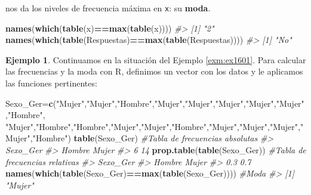 \documentclass[
]{book}
\newenvironment{Shaded}{\begin{snugshade}}{\end{snugshade}}
\newcommand{\CommentTok}[1]{\textcolor[rgb]{0.56,0.35,0.01}{\textit{#1}}}
\newcommand{\KeywordTok}[1]{\textcolor[rgb]{0.13,0.29,0.53}{\textbf{#1}}}
\newcommand{\NormalTok}[1]{#1}
\newcommand{\OperatorTok}[1]{\textcolor[rgb]{0.81,0.36,0.00}{\textbf{#1}}}
\newcommand{\StringTok}[1]{\textcolor[rgb]{0.31,0.60,0.02}{#1}}
\theoremstyle{definition}
\theoremstyle{definition}
\newtheorem{example}{Ejemplo}[chapter]
\theoremstyle{definition}
\theoremstyle{remark}
\begin{document}
nos da los niveles de frecuencia máxima en \texttt{x}: su \textbf{moda}.

\begin{Shaded}
\begin{Highlighting}[]
\KeywordTok{names}\NormalTok{(}\KeywordTok{which}\NormalTok{(}\KeywordTok{table}\NormalTok{(x)}\OperatorTok{==}\KeywordTok{max}\NormalTok{(}\KeywordTok{table}\NormalTok{(x))))}
\CommentTok{\#\textgreater{} [1] "2"}
\KeywordTok{names}\NormalTok{(}\KeywordTok{which}\NormalTok{(}\KeywordTok{table}\NormalTok{(Respuestas)}\OperatorTok{==}\KeywordTok{max}\NormalTok{(}\KeywordTok{table}\NormalTok{(Respuestas))))}
\CommentTok{\#\textgreater{} [1] "No"}
\end{Highlighting}
\end{Shaded}

\begin{example}
\protect\hypertarget{exm:sexo}{}{\label{exm:sexo} }Continuamos en la situación del Ejemplo \ref{exm:ex1601}. Para calcular las frecuencias y la moda con R, definimos un vector con los datos y le aplicamos las funciones pertinentes:
\end{example}

\begin{Shaded}
\begin{Highlighting}[]
\NormalTok{Sexo\_Ger=}\KeywordTok{c}\NormalTok{(}\StringTok{"Mujer"}\NormalTok{,}\StringTok{"Mujer"}\NormalTok{,}\StringTok{"Hombre"}\NormalTok{,}\StringTok{"Mujer"}\NormalTok{,}\StringTok{"Mujer"}\NormalTok{,}\StringTok{"Mujer"}\NormalTok{,}\StringTok{"Mujer"}\NormalTok{,}\StringTok{"Mujer"}\NormalTok{,}\StringTok{"Hombre"}\NormalTok{,}
  \StringTok{"Mujer"}\NormalTok{,}\StringTok{"Hombre"}\NormalTok{,}\StringTok{"Hombre"}\NormalTok{,}\StringTok{"Mujer"}\NormalTok{,}\StringTok{"Mujer"}\NormalTok{,}\StringTok{"Hombre"}\NormalTok{,}\StringTok{"Mujer"}\NormalTok{,}\StringTok{"Mujer"}\NormalTok{,}\StringTok{"Mujer"}\NormalTok{,}\StringTok{"Mujer"}\NormalTok{,}\StringTok{"Hombre"}\NormalTok{)}
\KeywordTok{table}\NormalTok{(Sexo\_Ger)  }\CommentTok{\#Tabla de frecuencias absolutas}
\CommentTok{\#\textgreater{} Sexo\_Ger}
\CommentTok{\#\textgreater{} Hombre  Mujer }
\CommentTok{\#\textgreater{}      6     14}
\KeywordTok{prop.table}\NormalTok{(}\KeywordTok{table}\NormalTok{(Sexo\_Ger)) }\CommentTok{\#Tabla de frecuencias relativas}
\CommentTok{\#\textgreater{} Sexo\_Ger}
\CommentTok{\#\textgreater{} Hombre  Mujer }
\CommentTok{\#\textgreater{}    0.3    0.7}
\KeywordTok{names}\NormalTok{(}\KeywordTok{which}\NormalTok{(}\KeywordTok{table}\NormalTok{(Sexo\_Ger)}\OperatorTok{==}\KeywordTok{max}\NormalTok{(}\KeywordTok{table}\NormalTok{(Sexo\_Ger)))) }\CommentTok{\#Moda}
\CommentTok{\#\textgreater{} [1] "Mujer"}
\end{Highlighting}
\end{Shaded}
\end{document}
